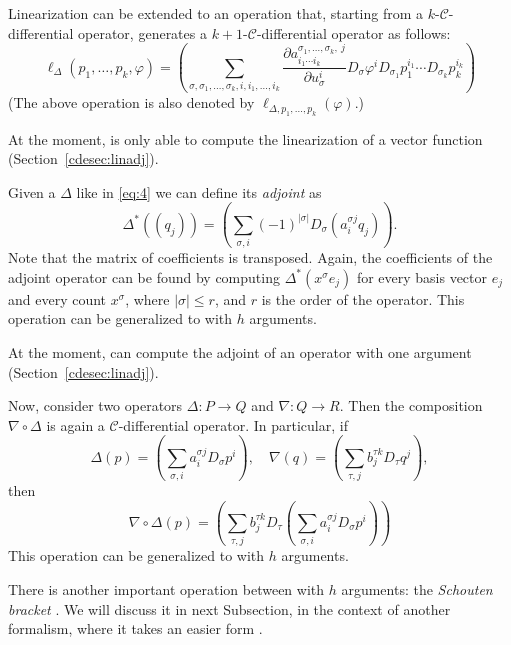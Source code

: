 Linearization can be extended to an operation that, starting from a
$k$-$\mathcal{C}$-differential operator, generates a
$k+1$-$\mathcal{C}$-differential operator as follows:
\begin{displaymath}
  \ell_{\Delta}(p_1,\dots,p_k,\varphi) =
  (\sum_{\sigma,\sigma_1,\ldots,\sigma_k, i,i_1,\ldots,i_k}
  \frac{\partial a^{\sigma_1,\ldots,\sigma_k,\ j}_{i_1\cdots i_k}}{\partial
    u^i_\sigma}
  D_{\sigma}\varphi^i D_{\sigma_1}p_1^{i_1}\cdots D_{\sigma_k}p_k^{i_k})
\end{displaymath}
(The above operation is also denoted by $\ell_{\Delta,p_1,\dots,p_k}(\varphi)$.)

At the moment, \cde is only able to compute the linearization of a vector
function (Section~\ref{cdesec:linadj}).

Given a \cdiffop $\Delta$ like in \eqref{eq:4} we can define its \emph{adjoint}
as
\begin{equation}\label{eq:5}
  \Delta^*((q_j)) =
  (\sum_{\sigma, i}  (-1)^{|\sigma|} D_\sigma(a^{\sigma j}_i q_j)).
\end{equation}
Note that the matrix of coefficients is transposed. Again, the coefficients of
the adjoint operator can be found by computing $\Delta^*(x^\sigma e_j)$ for
every basis vector $e_j$ and every count $x^\sigma$, where $|\sigma|\leq r$,
and $r$ is the order of the operator. This operation can be generalized to
\cdiffops with $h$ arguments.

At the moment, \cde can compute the adjoint of an operator with one argument
(Section~\ref{cdesec:linadj}).

Now, consider two operators $\Delta\colon P\to Q$ and $\nabla\colon Q\to R$.
Then the composition $\nabla\circ\Delta$ is again a $\mathcal{C}$-differential
operator. In particular, if
\begin{displaymath}
  \Delta(p) = (\sum_{\sigma, i}a^{\sigma j}_i D_\sigma p^i),\quad
  \nabla(q) = (\sum_{\tau, j}b^{\tau k}_j D_\tau q^j),
\end{displaymath}
then
\begin{displaymath}
  \nabla\circ\Delta(p) =
  (\sum_{\tau, j}b^{\tau k}_j D_\tau (\sum_{\sigma, i}a^{\sigma j}_i D_\sigma p^i))
\end{displaymath}
This operation can be generalized to
\cdiffops with $h$ arguments.

There is another important operation between \cdiffops with $h$ arguments: the
\emph{Schouten bracket} \cite{Krasilshchik:99}. We will discuss it in next Subsection, in
the context of another formalism, where it takes an easier form \cite{KerstenKrasilshchikVerboretsky:2004}.


